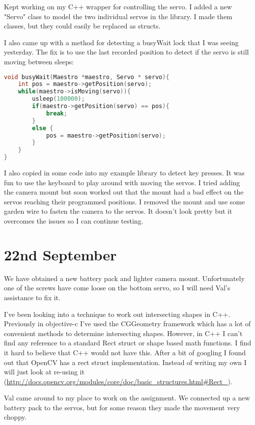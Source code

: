 Kept working on my C++ wrapper for controlling the servo. I added a new "Servo" class to model the two individual servos in the library. I made them classes, but they could easily be replaced as structs.

I also came up with a method for detecting a busyWait lock that I was seeing yesterday. The fix is to use the last recorded position to detect if the servo is still moving between sleeps:

\begin{lstlisting}[language=C++]
void busyWait(Maestro *maestro, Servo * servo){
    int pos = maestro->getPosition(servo);
    while(maestro->isMoving(servo)){
        usleep(100000);
        if(maestro->getPosition(servo) == pos){
            break;
        }
        else {
            pos = maestro->getPosition(servo);
        }
    }
}
\end{lstlisting}

I also copied in some code into my example library to detect key presses. It was fun to use the keyboard to play around with moving the servos. I tried adding the camera mount but soon worked out that the mount had a bad effect on the servos reaching their programmed positions. I removed the mount and use some garden wire to fasten the camera to the servos. It doesn't look pretty but it overcomes the issues so I can continue testing.




\section*{22nd September}

We have obtained a new battery pack and lighter camera mount. Unfortunately one of the screws have come loose on the bottom servo, so I will need Val's assistance to fix it.

I've been looking into a technique to work out intersecting shapes in C++. Previously in objective-c I've used the CGGeometry framework which has a lot of convenient methods to determine intersecting shapes. However, in C++ I can't find any reference to a standard Rect struct or shape based math functions. I find it hard to believe that C++ would not have this. After a bit of googling I found out that OpenCV has a rect struct implementation. Instead of writing my own I will just look at re-using it (\url{http://docs.opencv.org/modules/core/doc/basic_structures.html#Rect_}).

Val came around to my place to work on the assignment. We connected up a new battery pack to the servos, but for some reason they made the movement very choppy.

